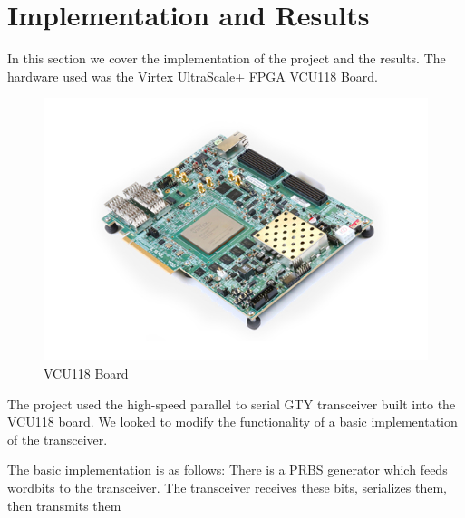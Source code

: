 \chapter{Implementation and Results}
In this section we cover the implementation of the project and the results.
The hardware used was the Virtex UltraScale+ FPGA VCU118 Board.
\begin{figure}[ht]
    \centering
    \includegraphics[width=0.8\linewidth]{img/board.jpg}
    \caption{VCU118 Board}%
    \label{fig:board}
\end{figure}

The project used the high-speed parallel to serial GTY transceiver built into
the VCU118 board. We looked to modify the functionality of a basic
implementation of the  transceiver.

The basic implementation is as follows:
There is a PRBS generator which feeds wordbits to the transceiver. The
transceiver receives these bits, serializes them, then transmits them
